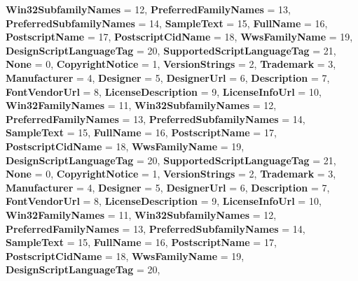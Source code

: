 \begin{DoxyCompactItemize}
{\bfseries Win32\+Subfamily\+Names} = 12, 
{\bfseries Preferred\+Family\+Names} = 13, 
{\bfseries Preferred\+Subfamily\+Names} = 14, 
{\bfseries Sample\+Text} = 15, 
\newline
{\bfseries Full\+Name} = 16, 
{\bfseries Postscript\+Name} = 17, 
{\bfseries Postscript\+Cid\+Name} = 18, 
{\bfseries Wws\+Family\+Name} = 19, 
\newline
{\bfseries Design\+Script\+Language\+Tag} = 20, 
{\bfseries Supported\+Script\+Language\+Tag} = 21, 
{\bfseries None} = 0, 
{\bfseries Copyright\+Notice} = 1, 
\newline
{\bfseries Version\+Strings} = 2, 
{\bfseries Trademark} = 3, 
{\bfseries Manufacturer} = 4, 
{\bfseries Designer} = 5, 
\newline
{\bfseries Designer\+Url} = 6, 
{\bfseries Description} = 7, 
{\bfseries Font\+Vendor\+Url} = 8, 
{\bfseries License\+Description} = 9, 
\newline
{\bfseries License\+Info\+Url} = 10, 
{\bfseries Win32\+Family\+Names} = 11, 
{\bfseries Win32\+Subfamily\+Names} = 12, 
{\bfseries Preferred\+Family\+Names} = 13, 
\newline
{\bfseries Preferred\+Subfamily\+Names} = 14, 
{\bfseries Sample\+Text} = 15, 
{\bfseries Full\+Name} = 16, 
{\bfseries Postscript\+Name} = 17, 
\newline
{\bfseries Postscript\+Cid\+Name} = 18, 
{\bfseries Wws\+Family\+Name} = 19, 
{\bfseries Design\+Script\+Language\+Tag} = 20, 
{\bfseries Supported\+Script\+Language\+Tag} = 21, 
\newline
{\bfseries None} = 0, 
{\bfseries Copyright\+Notice} = 1, 
{\bfseries Version\+Strings} = 2, 
{\bfseries Trademark} = 3, 
\newline
{\bfseries Manufacturer} = 4, 
{\bfseries Designer} = 5, 
{\bfseries Designer\+Url} = 6, 
{\bfseries Description} = 7, 
\newline
{\bfseries Font\+Vendor\+Url} = 8, 
{\bfseries License\+Description} = 9, 
{\bfseries License\+Info\+Url} = 10, 
{\bfseries Win32\+Family\+Names} = 11, 
\newline
{\bfseries Win32\+Subfamily\+Names} = 12, 
{\bfseries Preferred\+Family\+Names} = 13, 
{\bfseries Preferred\+Subfamily\+Names} = 14, 
{\bfseries Sample\+Text} = 15, 
\newline
{\bfseries Full\+Name} = 16, 
{\bfseries Postscript\+Name} = 17, 
{\bfseries Postscript\+Cid\+Name} = 18, 
{\bfseries Wws\+Family\+Name} = 19, 
\newline
{\bfseries Design\+Script\+Language\+Tag} = 20, 

\end{DoxyCompactItemize}
